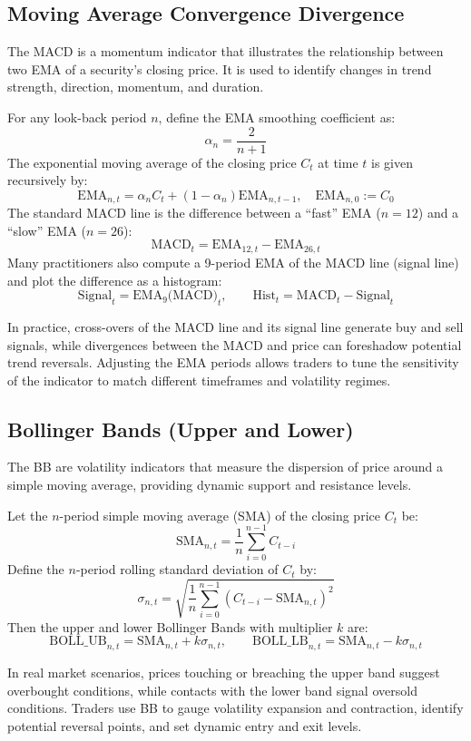 \subsection{Moving Average Convergence Divergence}
The \gls{MACD} is a momentum indicator that illustrates the relationship between two \gls{EMA} of a security's closing price. It is used to identify changes in trend strength, direction, momentum, and duration.

For any look-back period \(n\), define the \gls{EMA} smoothing coefficient as:
\[\alpha_n = \frac{2}{n+1}\]
The exponential moving average of the closing price \(C_t\) at time \(t\) is given recursively by:
\[\mathrm{EMA}_{n,t} = \alpha_n C_t + (1 - \alpha_n) \mathrm{EMA}_{n,t-1} , \quad \mathrm{EMA}_{n,0} := C_0\]
The standard \gls{MACD} line is the difference between a “fast” \gls{EMA} (\(n=12\)) and a “slow” \gls{EMA} (\(n=26\)):
\[\mathrm{MACD}_t = \mathrm{EMA}_{12,t} - \mathrm{EMA}_{26,t}\]
Many practitioners also compute a 9-period \gls{EMA} of the \gls{MACD} line (signal line) and plot the difference as a histogram:
\[\mathrm{Signal}_t = \mathrm{EMA}_{9}\bigl(\mathrm{MACD}\bigr)_t, \qquad \mathrm{Hist}_t = \mathrm{MACD}_t - \mathrm{Signal}_t\]

In practice, cross-overs of the \gls{MACD} line and its signal line generate buy and sell signals, while divergences between the \gls{MACD} and price can foreshadow potential trend reversals. Adjusting the \gls{EMA} periods allows traders to tune the sensitivity of the indicator to match different timeframes and volatility regimes.

\subsection{Bollinger Bands (Upper and Lower)}
The \gls{BB} are volatility indicators that measure the dispersion of price around a simple moving average, providing dynamic support and resistance levels.

Let the \(n\)-period simple moving average (SMA) of the closing price \(C_t\) be:
\[\mathrm{SMA}_{n,t} = \frac{1}{n} \sum_{i=0}^{n-1} C_{t-i}\]
Define the \(n\)-period rolling standard deviation of \(C_t\) by:
\[\sigma_{n,t} = \sqrt{\frac{1}{n} \sum_{i=0}^{n-1} (C_{t-i} - \mathrm{SMA}_{n,t})^2}\]
Then the upper and lower Bollinger Bands with multiplier \(k\) are:
\[\mathrm{BOLL\_UB}_{n,t} = \mathrm{SMA}_{n,t} + k \sigma_{n,t}, \qquad \mathrm{BOLL\_LB}_{n,t} = \mathrm{SMA}_{n,t} - k \sigma_{n,t}\]

In real market scenarios, prices touching or breaching the upper band suggest overbought conditions, while contacts with the lower band signal oversold conditions. Traders use \gls{BB} to gauge volatility expansion and contraction, identify potential reversal points, and set dynamic entry and exit levels.

